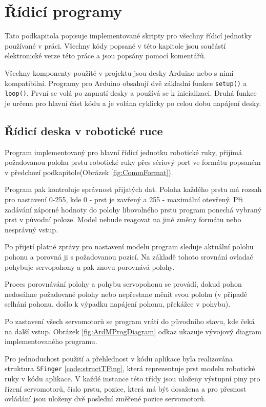 \documentclass[thesis=B,czech]{FITthesis}[2012/06/26]
\begin{document}
  
 
\section{Řídicí programy}

Tato podkapitola popisuje implementované skripty pro všechny řídicí jednotky používané v práci. Všechny kódy popsané v této kapitole jsou součástí elektronické verze této práce a jsou popsány pomocí komentářů. 

Všechny komponenty použité v projektu jsou desky Arduino nebo s nimi kompatibilní. Programy pro Arduino obsahují dvě základní funkce \texttt{setup()} a \texttt{loop()}. První se volá po zapnutí desky a používá se k inicializaci. Druhá funkce je určena pro hlavní část kódu a je volána cyklicky po celou dobu napájení desky.

\subsection{Řídicí deska v robotické ruce}

Program implementovaný pro hlavní řídicí jednotku robotické ruky, přijímá požadovanou polohu prstu robotické ruky přes sériový port ve formátu popsaném v předchozí podkapitole(Obrázek \ref{fig:CommFormat}). 

Program pak kontroluje správnost přijatých dat. Poloha každého prstu má rozsah pro nastavení 0-255, kde 0 - prst je zavřený a 255 - maximální otevřený. Při zadávání záporné hodnoty do polohy libovolného prstu program ponechá vybraný prst v původní poloze. Model nebude reagovat na jiné změny formátu nebo nesprávný vstup. 

Po přijetí platné zprávy pro nastavení modelu program sleduje aktuální polohu pohonu a porovná ji s požadovanou pozicí. Na základě tohoto srovnání ovladač pohybuje servopohony a pak znovu porovnává polohy. 

Proces porovnávání polohy a pohybu servopohonu se provádí, dokud pohon nedosáhne požadované polohy nebo nepřestane měnit svou polohu (v případě selhání pohonu, došlo k výpadku napájení pohonu, překážce v pohybu). 

Po zastavení všech servomotorů se program vrátí do původního stavu, kde čeká na další vstup. Obrázek \ref{fig:ArdMProgDiagram} odkaz ukazuje vývojový diagram implementovaného programu. 

Pro jednoduchost použití a přehlednost v kódu aplikace byla realizována struktura \texttt{SFinger} \ref{code:structTFing}, která reprezentuje prst modelu robotické ruky v kódu aplikace. V každé instance této třídy jsou uloženy výstupní piny pro řízení servomotorů, číslo prstu, pozice, která má být dosažena a pro přesnost ovládání jsou uloženy dvě poslední změřené pozice servomotorů. 
\end{document}

